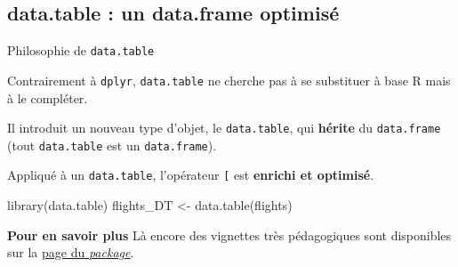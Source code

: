 \documentclass[12pt,ignorenonframetext,]{beamer}
\newenvironment{Shaded}{}{}
\newcommand{\KeywordTok}[1]{\textcolor[rgb]{0.00,0.00,1.00}{#1}}
\newcommand{\NormalTok}[1]{#1}
\newcommand{\StringTok}[1]{\textcolor[rgb]{0.00,0.50,0.50}{#1}}
\renewenvironment{Shaded}{\begin{snugshade}}{\end{snugshade}}
\newcommand{\intertitre}[1]{\textcolor{redInsee}{\textbf{#1}}}
\begin{document}
\hypertarget{data.table-un-data.frame-optimise}{%
\subsection{data.table : un data.frame
optimisé}\label{data.table-un-data.frame-optimise}}

\begin{frame}[fragile]{Philosophie de \texttt{data.table}}
\protect\hypertarget{philosophie-de-data.table}{}

Contrairement à \texttt{dplyr}, \texttt{data.table} ne cherche pas à se
substituer à base R mais à le compléter.

\pause Il introduit un nouveau type d’objet, le \texttt{data.table}, qui
\textbf{hérite} du \texttt{data.frame} (tout \texttt{data.table} est un
\texttt{data.frame}).

\pause Appliqué à un \texttt{data.table}, l’opérateur \texttt{{[}} est
\textbf{enrichi et optimisé}.

\begin{Shaded}
\begin{Highlighting}[]
\KeywordTok{library}\NormalTok{(data.table)}
\NormalTok{flights_DT <-}\StringTok{ }\KeywordTok{data.table}\NormalTok{(flights)}
\end{Highlighting}
\end{Shaded}

\pause

\intertitre{Pour en savoir plus} Là encore des vignettes très
pédagogiques sont disponibles sur la
\href{https://cran.r-project.org/package=data.table}{\underline{page du \textit{package}}}.

\end{frame}
\end{document}
